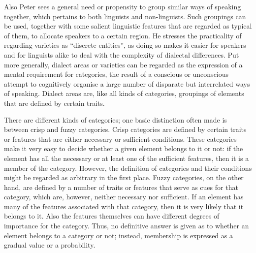 \documentclass[output=paper]{LSP/langsci}
\begin{document}
Also Peter \citet[807]{wiesinger_einteilung_1983} sees a general need or propensity to group similar ways of speaking together, which pertains to both linguists and non-linguists. Such groupings can be used, together with some salient linguistic features that are regarded as typical of them, to allocate speakers to a certain region. He stresses the practicality of regarding varieties as “discrete entities”, as doing so makes it easier for speakers and for linguists alike to deal with the complexity of dialectal differences. Put more generally, dialect areas or varieties can be regarded as the expression of a mental requirement for categories, the result of a conscious or unconscious attempt to cognitively organise a large number of disparate but interrelated ways of speaking. Dialect areas are, like all kinds of categories, groupings of elements that are defined by certain traits.

There are different kinds of categories; one basic distinction often made is between crisp and fuzzy categories. Crisp categories are defined by certain traits or features that are either necessary or sufficient conditions. These categories make it very easy to decide whether a given element belongs to it or not: if the element has all the necessary or at least one of the sufficient features, then it is a member of the category. However, the definition of categories and their conditions might be regarded as arbitrary in the first place. Fuzzy categories, on the other hand, are defined by a number of traits or features that serve as cues for that category, which are, however, neither necessary nor sufficient. If an element has many of the features associated with that category, then it is very likely that it belongs to it. Also the features themselves can have different degrees of importance for the category. Thus, no definitive answer is given as to whether an element belongs to a category or not; instead, membership is expressed as a gradual value or a probability. 
\end{document}
